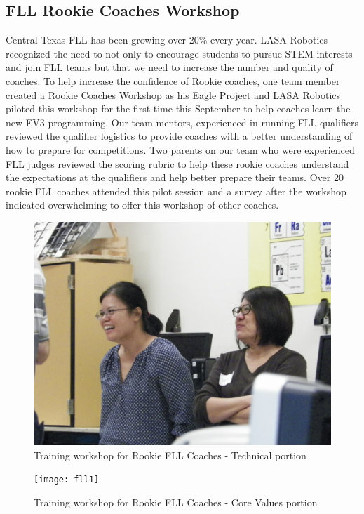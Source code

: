 \subsection{FLL Rookie Coaches Workshop}
Central Texas FLL has been growing over 20\% every year.  LASA Robotics recognized the need to not only to encourage students to pursue STEM interests and join FLL teams but that we need to increase the number and quality of coaches.  To help increase the confidence of Rookie coaches, one team member created a Rookie Coaches Workshop as his Eagle Project and LASA Robotics piloted this workshop for the first time this September to help coaches learn the new EV3 programming.   Our team mentors, experienced in running FLL qualifiers reviewed the qualifier logistics to provide coaches with a better understanding of how to prepare for competitions.  Two parents on our team who were experienced FLL judges reviewed the scoring rubric to help these rookie coaches understand the expectations at the qualifiers and help better prepare their teams.  Over 20 rookie FLL coaches attended this pilot session and a survey after the workshop indicated overwhelming to offer this workshop of other coaches.
\begin{figure}[H]
	\centering
	\includegraphics[width=0.4\linewidth]{fll}
	\caption[]{Training workshop for Rookie FLL Coaches - Technical portion}
	\label{fig:fll}
\end{figure}
\begin{figure}[H]
	\centering
	\texttt{[image: fll1]}
	\caption[]{Training workshop for Rookie FLL Coaches - Core Values portion}
	\label{fig:fll1}
\end{figure}

